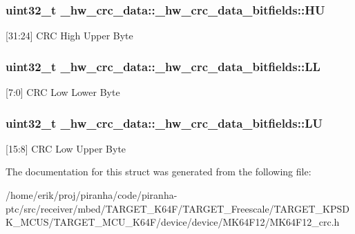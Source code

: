 \subsubsection[{\texorpdfstring{HU}{HU}}]{\setlength{\rightskip}{0pt plus 5cm}uint32\+\_\+t \+\_\+hw\+\_\+crc\+\_\+data\+::\+\_\+hw\+\_\+crc\+\_\+data\+\_\+bitfields\+::\+HU}\hypertarget{struct__hw__crc__data_1_1__hw__crc__data__bitfields_ad1c54e62d30d268ad1b012b06171ba45}{}\label{struct__hw__crc__data_1_1__hw__crc__data__bitfields_ad1c54e62d30d268ad1b012b06171ba45}
\mbox{[}31\+:24\mbox{]} C\+RC High Upper Byte 
\subsubsection[{\texorpdfstring{LL}{LL}}]{\setlength{\rightskip}{0pt plus 5cm}uint32\+\_\+t \+\_\+hw\+\_\+crc\+\_\+data\+::\+\_\+hw\+\_\+crc\+\_\+data\+\_\+bitfields\+::\+LL}\hypertarget{struct__hw__crc__data_1_1__hw__crc__data__bitfields_a566374b91545fb28fcf368e423ae19d3}{}\label{struct__hw__crc__data_1_1__hw__crc__data__bitfields_a566374b91545fb28fcf368e423ae19d3}
\mbox{[}7\+:0\mbox{]} C\+RC Low Lower Byte 
\subsubsection[{\texorpdfstring{LU}{LU}}]{\setlength{\rightskip}{0pt plus 5cm}uint32\+\_\+t \+\_\+hw\+\_\+crc\+\_\+data\+::\+\_\+hw\+\_\+crc\+\_\+data\+\_\+bitfields\+::\+LU}\hypertarget{struct__hw__crc__data_1_1__hw__crc__data__bitfields_a88ede13310999f00cf5a8250a2960e9e}{}\label{struct__hw__crc__data_1_1__hw__crc__data__bitfields_a88ede13310999f00cf5a8250a2960e9e}
\mbox{[}15\+:8\mbox{]} C\+RC Low Upper Byte 

The documentation for this struct was generated from the following file\+:\begin{DoxyCompactItemize}
\item 
/home/erik/proj/piranha/code/piranha-\/ptc/src/receiver/mbed/\+T\+A\+R\+G\+E\+T\+\_\+\+K64\+F/\+T\+A\+R\+G\+E\+T\+\_\+\+Freescale/\+T\+A\+R\+G\+E\+T\+\_\+\+K\+P\+S\+D\+K\+\_\+\+M\+C\+U\+S/\+T\+A\+R\+G\+E\+T\+\_\+\+M\+C\+U\+\_\+\+K64\+F/device/device/\+M\+K64\+F12/M\+K64\+F12\+\_\+crc.\+h\end{DoxyCompactItemize}
